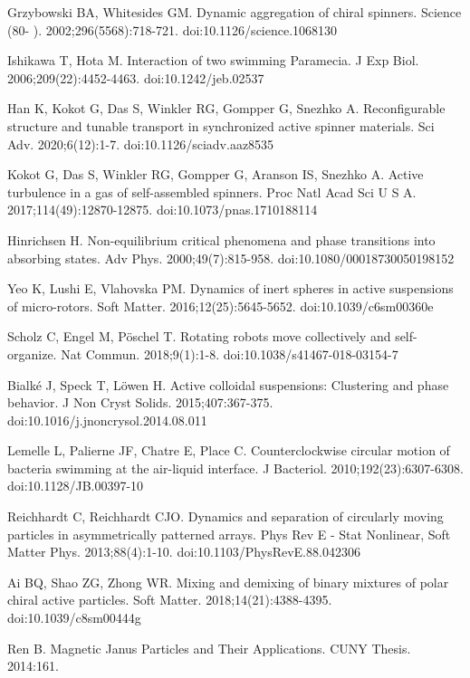 \documentclass[11pt]{article}
\begin{document}
\begin{thebibliography}{9}
Grzybowski BA, Whitesides GM. Dynamic aggregation of chiral spinners. Science (80- ). 2002;296(5568):718-721. doi:10.1126/science.1068130

Ishikawa T, Hota M. Interaction of two swimming Paramecia. J Exp Biol. 2006;209(22):4452-4463. doi:10.1242/jeb.02537

Han K, Kokot G, Das S, Winkler RG, Gompper G, Snezhko A. Reconfigurable structure and tunable transport in synchronized active spinner materials. Sci Adv. 2020;6(12):1-7. doi:10.1126/sciadv.aaz8535

Kokot G, Das S, Winkler RG, Gompper G, Aranson IS, Snezhko A. Active turbulence in a gas of self-assembled spinners. Proc Natl Acad Sci U S A. 2017;114(49):12870-12875. doi:10.1073/pnas.1710188114

Hinrichsen H. Non-equilibrium critical phenomena and phase transitions into absorbing states. Adv Phys. 2000;49(7):815-958. doi:10.1080/00018730050198152

Yeo K, Lushi E, Vlahovska PM. Dynamics of inert spheres in active suspensions of micro-rotors. Soft Matter. 2016;12(25):5645-5652. doi:10.1039/c6sm00360e

Scholz C, Engel M, Pöschel T. Rotating robots move collectively and self-organize. Nat Commun. 2018;9(1):1-8. doi:10.1038/s41467-018-03154-7

Bialké J, Speck T, Löwen H. Active colloidal suspensions: Clustering and phase behavior. J Non Cryst Solids. 2015;407:367-375. doi:10.1016/j.jnoncrysol.2014.08.011

Lemelle L, Palierne JF, Chatre E, Place C. Counterclockwise circular motion of bacteria swimming at the air-liquid interface. J Bacteriol. 2010;192(23):6307-6308. doi:10.1128/JB.00397-10

Reichhardt C, Reichhardt CJO. Dynamics and separation of circularly moving particles in asymmetrically patterned arrays. Phys Rev E - Stat Nonlinear, Soft Matter Phys. 2013;88(4):1-10. doi:10.1103/PhysRevE.88.042306


Ai BQ, Shao ZG, Zhong WR. Mixing and demixing of binary mixtures of polar chiral active particles. Soft Matter. 2018;14(21):4388-4395. doi:10.1039/c8sm00444g

Ren B. Magnetic Janus Particles and Their Applications. CUNY Thesis. 2014:161.


\end{thebibliography}
\end{document}
